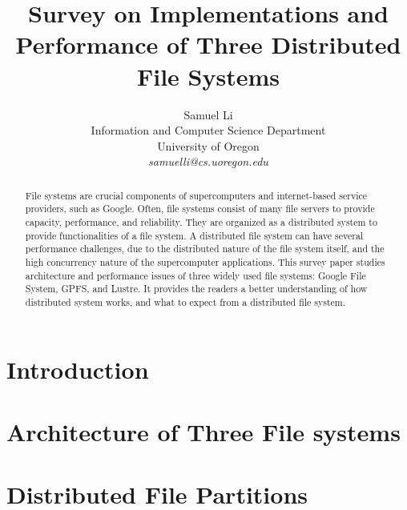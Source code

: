 \documentclass[12pt,twocolumn]{IEEEtran11}
\begin{document}


\title{\Large \bf 
Survey on Implementations and Performance of Three
Distributed File Systems
}
\author{
Samuel Li\\
Information and Computer Science Department\\
University of Oregon\\
{\em samuelli@cs.uoregon.edu}
}
\maketitle
\begin{abstract}
File systems are crucial components of supercomputers and internet-based
service providers, such as Google.
%
Often, file systems consist of many file servers
to provide capacity, performance, and reliability.
%
They are organized as a distributed system 
to provide functionalities of a file system.
%
A distributed file system can have several performance challenges,
due to the distributed nature of the file system itself,
and the high concurrency nature of the supercomputer applications.
%
This survey paper studies architecture and performance issues of three widely 
used file systems: Google File System, GPFS, and Lustre.
%
It provides the readers a better understanding of how distributed system
works, and what to expect from a distributed file system.
%
\end{abstract}


\section{Introduction}
\label{sec:intro}


\section{Architecture of Three File systems}
\label{sec:architecture}


\section{Distributed File Partitions}
\label{sec:file_partition}

\end{document}
